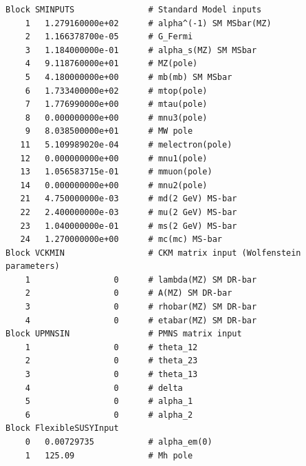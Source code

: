 \documentclass[final,3p,11pt,pdflatex]{elsarticle}
\begin{document}
\begin{lstlisting}
Block SMINPUTS               # Standard Model inputs
    1   1.279160000e+02      # alpha^(-1) SM MSbar(MZ)
    2   1.166378700e-05      # G_Fermi
    3   1.184000000e-01      # alpha_s(MZ) SM MSbar
    4   9.118760000e+01      # MZ(pole)
    5   4.180000000e+00      # mb(mb) SM MSbar
    6   1.733400000e+02      # mtop(pole)
    7   1.776990000e+00      # mtau(pole)
    8   0.000000000e+00      # mnu3(pole)
    9   8.038500000e+01      # MW pole
   11   5.109989020e-04      # melectron(pole)
   12   0.000000000e+00      # mnu1(pole)
   13   1.056583715e-01      # mmuon(pole)
   14   0.000000000e+00      # mnu2(pole)
   21   4.750000000e-03      # md(2 GeV) MS-bar
   22   2.400000000e-03      # mu(2 GeV) MS-bar
   23   1.040000000e-01      # ms(2 GeV) MS-bar
   24   1.270000000e+00      # mc(mc) MS-bar
Block VCKMIN                 # CKM matrix input (Wolfenstein parameters)
    1                 0      # lambda(MZ) SM DR-bar
    2                 0      # A(MZ) SM DR-bar
    3                 0      # rhobar(MZ) SM DR-bar
    4                 0      # etabar(MZ) SM DR-bar
Block UPMNSIN                # PMNS matrix input
    1                 0      # theta_12
    2                 0      # theta_23
    3                 0      # theta_13
    4                 0      # delta
    5                 0      # alpha_1
    6                 0      # alpha_2
Block FlexibleSUSYInput
    0   0.00729735           # alpha_em(0)
    1   125.09               # Mh pole
\end{lstlisting}
\end{document}
